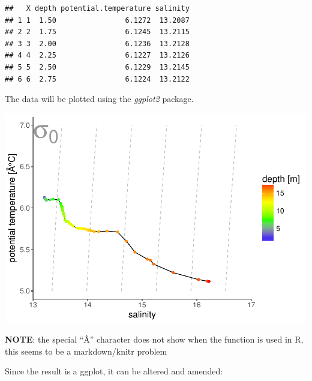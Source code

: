 \documentclass[]{article}
\newenvironment{Shaded}{\begin{snugshade}}{\end{snugshade}}
\newcommand{\KeywordTok}[1]{\textcolor[rgb]{0.13,0.29,0.53}{\textbf{#1}}}
\newcommand{\DataTypeTok}[1]{\textcolor[rgb]{0.13,0.29,0.53}{#1}}
\newcommand{\DecValTok}[1]{\textcolor[rgb]{0.00,0.00,0.81}{#1}}
\newcommand{\StringTok}[1]{\textcolor[rgb]{0.31,0.60,0.02}{#1}}
\newcommand{\OperatorTok}[1]{\textcolor[rgb]{0.81,0.36,0.00}{\textbf{#1}}}
\newcommand{\NormalTok}[1]{#1}
\begin{document}
\begin{verbatim}
##   X depth potential.temperature salinity
## 1 1  1.50                6.1272  13.2087
## 2 2  1.75                6.1245  13.2115
## 3 3  2.00                6.1236  13.2128
## 4 4  2.25                6.1227  13.2126
## 5 5  2.50                6.1229  13.2145
## 6 6  2.75                6.1224  13.2122
\end{verbatim}

The data will be plotted using the \emph{ggplot2} package.

\begin{Shaded}
\end{Shaded}

\includegraphics{README_files/figure-latex/plot_result-1.pdf}

\textbf{NOTE}: the special ``Â'' character does not show when the
function is used in R, this seems to be a markdown/knitr problem

Since the result is a ggplot, it can be altered and amended:
\end{document}
